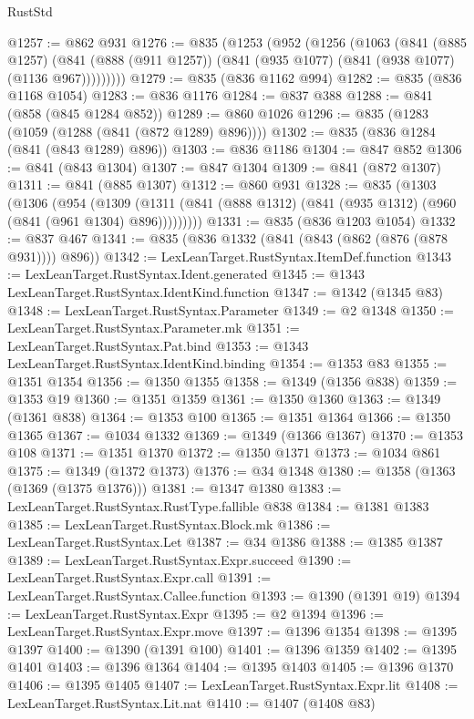 \begin{lexlean}{RustStd}
\begin{coremodule}
{\begin{coremodule}
{{{{{{{{{{@1257 := @862 @931
@1276 := @835
    (@1253
      (@952
        (@1256
          (@1063
            (@841
              (@885 @1257)
              (@841 (@888 (@911 @1257)) (@841 (@935 @1077) (@841 (@938 @1077) (@1136 @967)))))))))
@1279 := @835 (@836 @1162 @994)
@1282 := @835 (@836 @1168 @1054)
@1283 := @836 @1176
@1284 := @837 @388
@1288 := @841 (@858 (@845 @1284 @852))
@1289 := @860 @1026
@1296 := @835 (@1283 (@1059 (@1288 (@841 (@872 @1289) @896))))
@1302 := @835 (@836 @1284 (@841 (@843 @1289) @896))
@1303 := @836 @1186
@1304 := @847 @852
@1306 := @841 (@843 @1304)
@1307 := @847 @1304
@1309 := @841 (@872 @1307)
@1311 := @841 (@885 @1307)
@1312 := @860 @931
@1328 := @835
    (@1303
      (@1306
        (@954
          (@1309 (@1311 (@841 (@888 @1312) (@841 (@935 @1312) (@960 (@841 (@961 @1304) @896)))))))))
@1331 := @835 (@836 @1203 @1054)
@1332 := @837 @467
@1341 := @835 (@836 @1332 (@841 (@843 (@862 (@876 (@878 @931)))) @896))
@1342 := LexLeanTarget.RustSyntax.ItemDef.function
@1343 := LexLeanTarget.RustSyntax.Ident.generated
@1345 := @1343 LexLeanTarget.RustSyntax.IdentKind.function
@1347 := @1342 (@1345 @83)
@1348 := LexLeanTarget.RustSyntax.Parameter
@1349 := @2 @1348
@1350 := LexLeanTarget.RustSyntax.Parameter.mk
@1351 := LexLeanTarget.RustSyntax.Pat.bind
@1353 := @1343 LexLeanTarget.RustSyntax.IdentKind.binding
@1354 := @1353 @83
@1355 := @1351 @1354
@1356 := @1350 @1355
@1358 := @1349 (@1356 @838)
@1359 := @1353 @19
@1360 := @1351 @1359
@1361 := @1350 @1360
@1363 := @1349 (@1361 @838)
@1364 := @1353 @100
@1365 := @1351 @1364
@1366 := @1350 @1365
@1367 := @1034 @1332
@1369 := @1349 (@1366 @1367)
@1370 := @1353 @108
@1371 := @1351 @1370
@1372 := @1350 @1371
@1373 := @1034 @861
@1375 := @1349 (@1372 @1373)
@1376 := @34 @1348
@1380 := @1358 (@1363 (@1369 (@1375 @1376)))
@1381 := @1347 @1380
@1383 := LexLeanTarget.RustSyntax.RustType.fallible @838
@1384 := @1381 @1383
@1385 := LexLeanTarget.RustSyntax.Block.mk
@1386 := LexLeanTarget.RustSyntax.Let
@1387 := @34 @1386
@1388 := @1385 @1387
@1389 := LexLeanTarget.RustSyntax.Expr.succeed
@1390 := LexLeanTarget.RustSyntax.Expr.call
@1391 := LexLeanTarget.RustSyntax.Callee.function
@1393 := @1390 (@1391 @19)
@1394 := LexLeanTarget.RustSyntax.Expr
@1395 := @2 @1394
@1396 := LexLeanTarget.RustSyntax.Expr.move
@1397 := @1396 @1354
@1398 := @1395 @1397
@1400 := @1390 (@1391 @100)
@1401 := @1396 @1359
@1402 := @1395 @1401
@1403 := @1396 @1364
@1404 := @1395 @1403
@1405 := @1396 @1370
@1406 := @1395 @1405
@1407 := LexLeanTarget.RustSyntax.Expr.lit
@1408 := LexLeanTarget.RustSyntax.Lit.nat
@1410 := @1407 (@1408 @83)
}}}}}}}}}}
\end{coremodule}}
\end{coremodule}
\end{lexlean}
